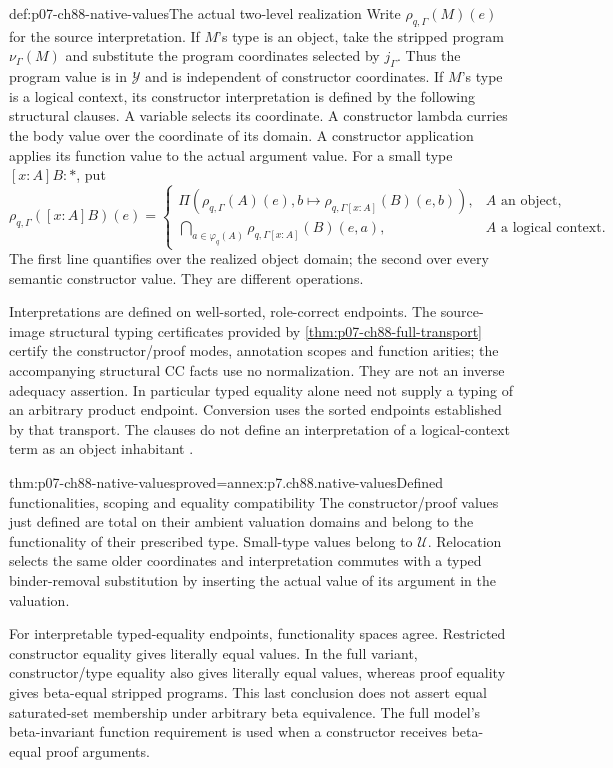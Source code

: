 \begin{hbdefinition}{def:p07-ch88-native-values}{The actual two-level realization}
Write \(\rho_{q,\Gamma}(M)(e)\) for the source interpretation.
If \(M\)'s type is an object, take the stripped program
\(\nu_\Gamma(M)\) and substitute the program coordinates selected
by \(j_\Gamma\). Thus the program value is in \(\mathcal Y\) and
is independent of constructor coordinates. If \(M\)'s type is a
logical context, its constructor interpretation is defined by the following
structural clauses. A variable selects its coordinate. A constructor
lambda curries the body value over the coordinate of its domain.
A constructor application applies its function value to the actual
argument value. For a small type \([x:A]B:\ast\), put
\[
\rho_{q,\Gamma}([x:A]B)(e)=
\begin{cases}
\Pi(\rho_{q,\Gamma}(A)(e),
 b\mapsto\rho_{q,\Gamma[x:A]}(B)(e,b)),&A\text{ an object},\\
\displaystyle\bigcap_{a\in\varphi_q(A)}
 \rho_{q,\Gamma[x:A]}(B)(e,a),&A\text{ a logical context}.
\end{cases}
\]
The first line quantifies over the realized object domain; the second
over every semantic constructor value. They are different operations.

Interpretations are defined on well-sorted, role-correct endpoints.
The source-image structural typing certificates provided by
\cref{thm:p07-ch88-full-transport} certify the constructor/proof modes,
annotation scopes and function arities; the accompanying structural CC
facts use no normalization. They are not an inverse adequacy assertion.
In particular typed equality alone need not supply a typing of an
arbitrary product endpoint. Conversion uses the sorted endpoints established
by that transport. The clauses do not define an interpretation of a
logical-context term as an object inhabitant
\cite[\S5.2, pp.~108--109]{CoquandHuet1988}.
\end{hbdefinition}

\begin{hblemma}{thm:p07-ch88-native-values}{proved=annex:p7.ch88.native-values}{Defined functionalities, scoping and equality compatibility}
The constructor/proof values just defined are total on their ambient
valuation domains and belong to the functionality of their prescribed
type. Small-type values belong to \(\mathcal U\).
Relocation selects the same older coordinates and interpretation commutes
with a typed binder-removal substitution by inserting the actual value
of its argument in the valuation.

For interpretable typed-equality endpoints, functionality spaces agree.
Restricted constructor equality gives literally equal values. In the full
variant, constructor/type equality also gives literally equal values,
whereas proof equality gives beta-equal stripped programs. This last
conclusion does not assert equal saturated-set membership under arbitrary
beta equivalence. The full model's beta-invariant function requirement
is used when a constructor receives beta-equal proof arguments.
\end{hblemma}

